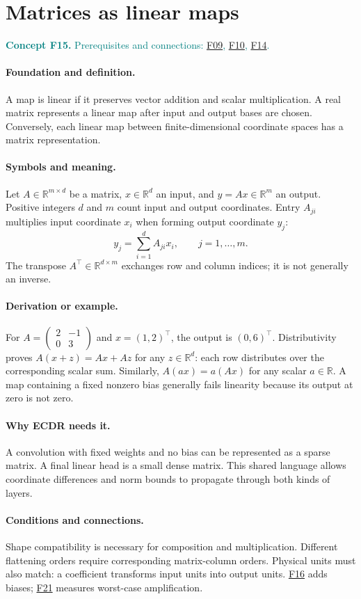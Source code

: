 \documentclass[11pt,a4paper]{article}
\newcommand{\R}{\mathbb R}
\newcommand{\conceptid}{Front matter}
\newcommand{\concept}[3]{\clearpage\renewcommand{\conceptid}{#1}%
\section{#2}\label{concept:#1}%
\textcolor{teal}{\textbf{Concept #1.} Prerequisites and connections: #3.}\par
\typeout{ECDR-CONCEPT-START #1 PAGE=\thepage}}
\begin{document}
\concept{F15}{Matrices as linear maps}{\hyperref[concept:F09]{F09}, \hyperref[concept:F10]{F10}, \hyperref[concept:F14]{F14}}
\paragraph{Foundation and definition.}
A map is linear if it preserves vector addition and scalar
multiplication. A real matrix represents a linear map after input and
output bases are chosen. Conversely, each linear map between
finite-dimensional coordinate spaces has a matrix representation.
\paragraph{Symbols and meaning.}
Let $A\in\R^{m\times d}$ be a matrix, $x\in\R^d$ an input, and
$y=Ax\in\R^m$ an output. Positive integers $d$ and $m$ count input
and output coordinates. Entry $A_{ji}$ multiplies input coordinate
$x_i$ when forming output coordinate $y_j$:
\[
 y_j=\sum_{i=1}^{d}A_{ji}x_i,
 \qquad j=1,\ldots,m.
\]
The transpose $A^\top\in\R^{d\times m}$ exchanges row and column
indices; it is not generally an inverse.
\paragraph{Derivation or example.}
For
$A=\begin{pmatrix}2&-1\\0&3\end{pmatrix}$ and $x=(1,2)^\top$,
the output is $(0,6)^\top$. Distributivity proves
$A(x+z)=Ax+Az$ for any $z\in\R^d$: each row distributes over the
corresponding scalar sum. Similarly, $A(a x)=a(Ax)$ for any scalar
$a\in\R$. A map containing a fixed nonzero bias generally fails
linearity because its output at zero is not zero.
\paragraph{Why ECDR needs it.}
A convolution with fixed weights and no bias can be represented as a
sparse matrix. A final linear head is a small dense matrix. This shared
language allows coordinate differences and norm bounds to propagate
through both kinds of layers.
\paragraph{Conditions and connections.}
Shape compatibility is necessary for composition and multiplication.
Different flattening orders require corresponding matrix-column orders.
Physical units must also match: a coefficient transforms input units
into output units. \hyperref[concept:F16]{F16} adds biases; \hyperref[concept:F21]{F21} measures worst-case amplification.
\par\label{endconcept:F15}
\end{document}
